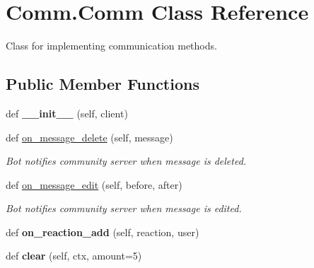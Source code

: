 \hypertarget{class_comm_1_1_comm}{}\section{Comm.\+Comm Class Reference}
\label{class_comm_1_1_comm}


Class for implementing communication methods.  


\subsection*{Public Member Functions}
\begin{DoxyCompactItemize}
\item 
\mbox{\label{class_comm_1_1_comm_a91c2fd3fbf29a96b4ac142ccc702b36b}} 
def {\bfseries \+\_\+\+\_\+init\+\_\+\+\_\+} (self, client)
\item 
def \mbox{\hyperlink{class_comm_1_1_comm_ae68aa6861ade9320962ae25bbcd82885}{on\+\_\+message\+\_\+delete}} (self, message)
\begin{DoxyCompactList}\small\item\em Bot notifies community server when message is deleted. \end{DoxyCompactList}\item 
def \mbox{\hyperlink{class_comm_1_1_comm_a899c1f36041c59c1cf6e0529f468ba11}{on\+\_\+message\+\_\+edit}} (self, before, after)
\begin{DoxyCompactList}\small\item\em Bot notifies community server when message is edited. \end{DoxyCompactList}\item 
\mbox{\label{class_comm_1_1_comm_ac14cfbcb7d52e0e72ebedfed36d49007}} 
def {\bfseries on\+\_\+reaction\+\_\+add} (self, reaction, user)
\item 
\mbox{\label{class_comm_1_1_comm_aea44c241bb9c9352bad624a802dcebe7}} 
def {\bfseries clear} (self, ctx, amount=5)
\end{DoxyCompactItemize}
